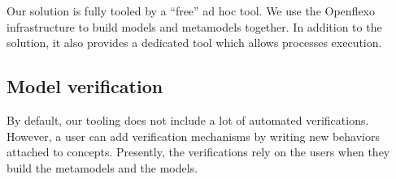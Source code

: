 Our solution is fully tooled by a ``free'' ad hoc tool. We use the Openflexo
infrastructure to build models and metamodels together. In addition to the
solution, it also provides a dedicated tool which allows processes execution. 

\subsection{Model verification}


By default, our tooling does not include a lot of automated verifications.
However, a user can add verification mechanisms by writing new behaviors
attached to concepts. Presently, the verifications rely on the users when they
build the metamodels and the models.

